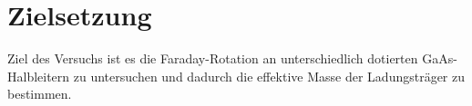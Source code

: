 \section{Zielsetzung}
\label{sec:zielsetzung}

Ziel des Versuchs ist es die Faraday-Rotation an unterschiedlich dotierten GaAs-Halbleitern zu untersuchen und dadurch die effektive Masse der Ladungsträger zu bestimmen. 